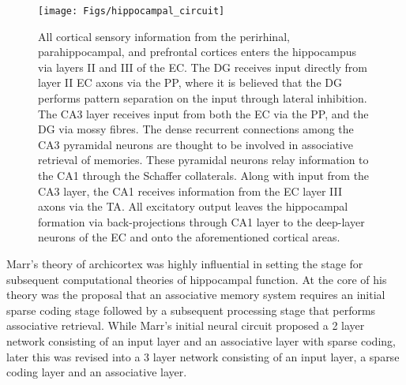 \begin{figure}[!ht]
\begin{center}
\texttt{[image: Figs/hippocampal\_circuit]}
\end{center}
\caption{
All cortical sensory information from the 
perirhinal, parahippocampal, and prefrontal cortices enters the hippocampus via 
layers II and III of the \ac{EC}. 
The \ac{DG} receives input directly from layer II 
\ac{EC} axons via the \ac{PP}, where it is believed that the \ac{DG} performs 
pattern separation on the input through lateral inhibition. 
The CA3 layer receives input from both the \ac{EC} via the \ac{PP}, and 
the \ac{DG} via mossy fibres. 
The dense recurrent connections among the 
CA3 pyramidal neurons are thought to be involved in 
associative retrieval of memories. 
These pyramidal neurons relay 
information to the CA1 through the Schaffer collaterals. 
Along with input from the CA3 layer, the CA1 receives information 
from the \ac{EC} layer III axons via the \ac{TA}. 
All excitatory output leaves the hippocampal formation via back-projections 
through CA1 layer to the deep-layer neurons of the \ac{EC} and onto the 
aforementioned cortical areas.
}
\label{fig:hippocampal_circuit}
\end{figure}

Marr's theory of archicortex \citep{marr-71} was highly influential in setting the stage
for subsequent computational theories of hippocampal function. 
At the core of his theory was the proposal that an associative memory 
system requires an initial sparse coding stage followed by a 
subsequent processing stage that performs associative retrieval. 
While Marr's initial neural circuit proposed a 2 layer network consisting 
of an input layer and an associative layer with sparse coding, later this was revised   
into a 3 layer network consisting of an input layer, a sparse coding layer and an associative layer.

